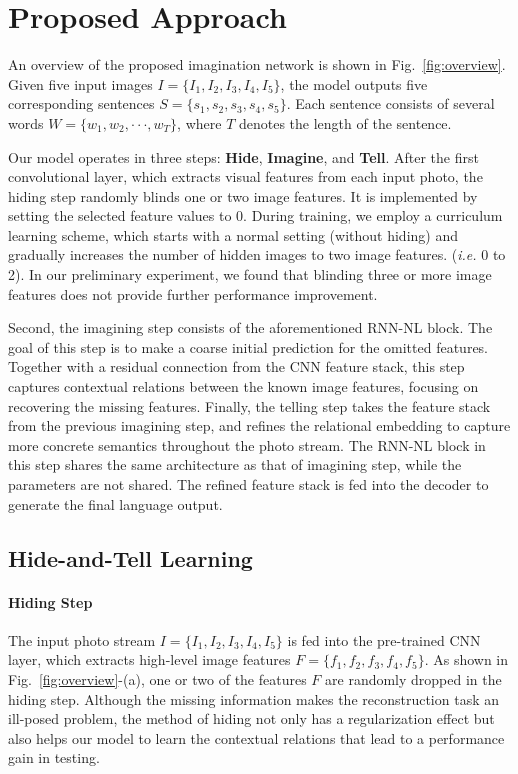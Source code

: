 \documentclass[letterpaper]{article} \usepackage{aaai20}  \usepackage{times}  \usepackage{helvet} \usepackage{courier}  \usepackage[hyphens]{url}  \usepackage{graphicx} \urlstyle{rm} \def\UrlFont{\rm}  \usepackage{graphicx}  \frenchspacing  \setlength{\pdfpagewidth}{8.5in}  \setlength{\pdfpageheight}{11in}
\newcommand{\figref}[1]{Fig.~\ref{#1}}
\newcommand{\ie}{{\it i.e. }}
\begin{document}
\section{Proposed Approach}
An overview of the proposed imagination network is shown in \figref{fig:overview}. 
Given five input images \textit{$ I = \{I_{1}, I_{2}, I_{3}, I_{4}, I_{5}\} $}, the model outputs five corresponding sentences \textit{$ S = \{s_{1}, s_{2}, s_{3}, s_{4}, s_{5}\} $}.
Each sentence consists of several words \textit{$ W = \{w_{1}, w_{2}, \cdot\cdot\cdot , w_{T}\} $}, where $T$ denotes the length of the sentence.

Our model operates in three steps: \textbf{Hide}, \textbf{Imagine}, and \textbf{Tell}. 
After the first convolutional layer, which extracts visual features from each input photo, the hiding step randomly blinds one or two image features. It is implemented by setting the selected feature values to 0. During training, we employ a curriculum learning scheme, which starts with a normal setting (without hiding) and gradually increases the number of hidden images to two image features. (\ie 0 to 2). In our preliminary experiment, we found that blinding three or more image features does not provide further performance improvement.

Second, the imagining step consists of the aforementioned RNN-NL block. The goal of this step is to make a coarse initial prediction for the omitted features. Together with a residual connection from the CNN feature stack, this step captures contextual relations between the known image features, focusing on recovering the missing features. Finally, the telling step takes the feature stack from the previous imagining step, and refines the relational embedding to capture more concrete semantics throughout the photo stream. The RNN-NL block in this step shares the same architecture as that of imagining step, while the parameters are not shared. The refined feature stack is fed into the decoder to generate the final language output.




\subsection{Hide-and-Tell Learning}
\paragraph{Hiding Step}
\quad

\noindent
The input photo stream \textit{$ I = \{I_{1}, I_{2}, I_{3}, I_{4}, I_{5}\} $} is fed into the pre-trained CNN layer, which extracts high-level image features \textit{$ F = \{f_{1}, f_{2}, f_{3}, f_{4}, f_{5}\} $}. As shown in \figref{fig:overview}-(a), one or two of the features $F$ are randomly dropped in the hiding step. Although the missing information makes the reconstruction task an ill-posed problem, the method of hiding not only has a regularization effect but also helps our model to learn the contextual relations that lead to a performance gain in testing.
\end{document}
